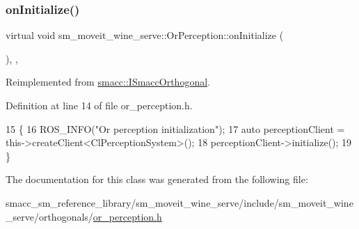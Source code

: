 \subsubsection{\texorpdfstring{on\+Initialize()}{onInitialize()}}
{\footnotesize\ttfamily virtual void sm\+\_\+moveit\+\_\+wine\+\_\+serve\+::\+Or\+Perception\+::on\+Initialize (\begin{DoxyParamCaption}{ }\end{DoxyParamCaption})\hspace{0.3cm}{\ttfamily [inline]}, {\ttfamily [override]}, {\ttfamily [virtual]}}



Reimplemented from \hyperlink{classsmacc_1_1ISmaccOrthogonal_a6bb31c620cb64dd7b8417f8705c79c7a}{smacc\+::\+I\+Smacc\+Orthogonal}.



Definition at line 14 of file or\+\_\+perception.\+h.


\begin{DoxyCode}
15     \{
16         ROS\_INFO(\textcolor{stringliteral}{"Or perception initialization"});
17         \textcolor{keyword}{auto} perceptionClient = this->createClient<ClPerceptionSystem>();
18         perceptionClient->initialize();
19     \}
\end{DoxyCode}


The documentation for this class was generated from the following file\+:\begin{DoxyCompactItemize}
\item 
smacc\+\_\+sm\+\_\+reference\+\_\+library/sm\+\_\+moveit\+\_\+wine\+\_\+serve/include/sm\+\_\+moveit\+\_\+wine\+\_\+serve/orthogonals/\hyperlink{sm__moveit__wine__serve_2include_2sm__moveit__wine__serve_2orthogonals_2or__perception_8h}{or\+\_\+perception.\+h}\end{DoxyCompactItemize}

